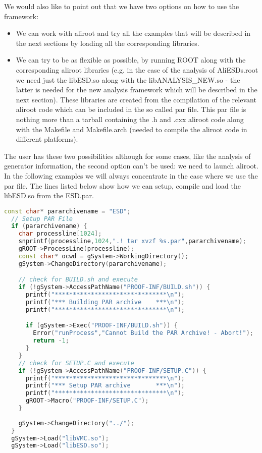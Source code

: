We would also like to point out that we have two options on how to use the framework:

\begin{itemize}
\item We can work with aliroot and try all the examples that will be described in the next sections by loading all the corresponding libraries.
\item We can try to be as flexible as possible, by running ROOT along with the corresponding aliroot libraries (e.g. in the case of the analysis of AliESDs.root we need just the libESD.so along with the libANALYSIS\_NEW.so - the latter is needed for the new analysis framework which will be described in the next section). These libraries are created from the compilation of the relevant aliroot code which can be included in the so called {\ttfamily par file}. This par file is nothing more than a tarball containing the .h and .cxx aliroot code along with the Makefile and Makefile.arch (needed to compile the aliroot code in different platforms).
\end{itemize}

The user has these two possibilities although for some cases, like the analysis of generator information, the second option can't be used: we need to launch aliroot. In the following examples we will always concentrate in the case where we use the {\ttfamily par file}. The lines listed below show how we can setup, compile and load the libESD.so from the {\ttfamily ESD.par}.

\vspace{2 cm}

\begin{lstlisting}[language=C++]
  const char* pararchivename = "ESD";
  // Setup PAR File
  if (pararchivename) {
    char processline[1024];
    snprintf(processline,1024,".! tar xvzf %s.par",pararchivename);
    gROOT->ProcessLine(processline);
    const char* ocwd = gSystem->WorkingDirectory();
    gSystem->ChangeDirectory(pararchivename);

    // check for BUILD.sh and execute
    if (!gSystem->AccessPathName("PROOF-INF/BUILD.sh")) {
      printf("*******************************\n");
      printf("*** Building PAR archive    ***\n");
      printf("*******************************\n");

      if (gSystem->Exec("PROOF-INF/BUILD.sh")) {
        Error("runProcess","Cannot Build the PAR Archive! - Abort!");
        return -1;
      }
    }
    // check for SETUP.C and execute
    if (!gSystem->AccessPathName("PROOF-INF/SETUP.C")) {
      printf("*******************************\n");
      printf("*** Setup PAR archive       ***\n");
      printf("*******************************\n");
      gROOT->Macro("PROOF-INF/SETUP.C");
    }
    
    gSystem->ChangeDirectory("../");
  }
  gSystem->Load("libVMC.so");
  gSystem->Load("libESD.so");
\end{lstlisting}

